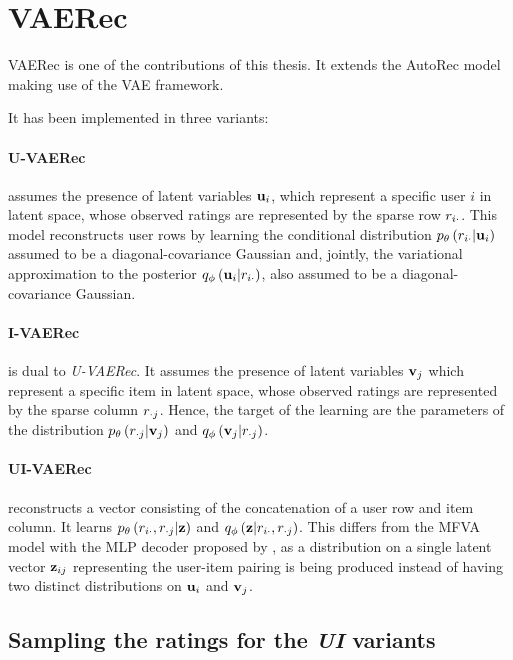\section{VAERec}

VAERec is one of the contributions of this thesis.
It extends the AutoRec model making use of the VAE framework.

It has been implemented in three variants:

\paragraph{U-VAERec} assumes the presence of latent variables
$\mathbf{u}_i$, which represent a specific user $i$ in latent space,
whose observed ratings are represented by the sparse row $r_{i\cdot}$.
This model reconstructs user rows by learning the conditional distribution
$p_\theta\left(r_{i\cdot}|\mathbf{u}_i\right)$ assumed to be a diagonal-covariance Gaussian
and, jointly, the variational approximation to the posterior
$q_\phi\left(\mathbf{u}_i|r_{i\cdot}\right)$, also assumed to be a diagonal-covariance Gaussian.

\paragraph{I-VAERec} is dual to \emph{U-VAERec}.
It assumes the presence of latent variables $\mathbf{v}_j$
which represent a specific item in latent space,
whose observed ratings are represented by the sparse column $r_{\cdot j}$.
Hence, the target of the learning are the parameters of
the distribution $p_\theta\left(r_{\cdot j}|\mathbf{v}_j\right)$
and $q_\phi\left(\mathbf{v}_j|r_{\cdot j}\right)$.

\paragraph{UI-VAERec} reconstructs a vector consisting of the concatenation
of a user row and item column.
It learns $p_\theta\left(r_{i\cdot},r_{\cdot j}|\mathbf{z}\right)$
and $q_\phi\left(\mathbf{z}|r_{i\cdot},r_{\cdot j}\right)$.
This differs from the MFVA model with 
the MLP decoder proposed by
\cite{vanBaalen2016}, as a distribution on a 
single latent vector $\mathbf{z}_{ij}$ representing
the user-item pairing is being produced instead 
of having two distinct distributions on
$\mathbf{u}_i$ and $\mathbf{v}_j$.

\subsection{Sampling the ratings for the \emph{UI} variants}

